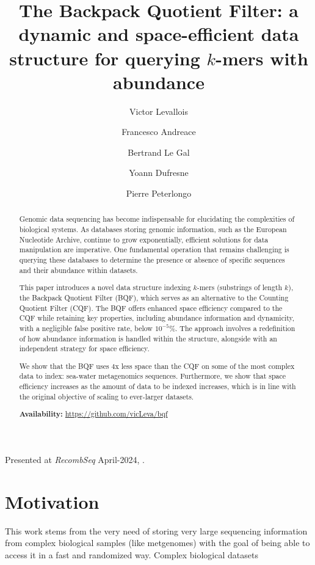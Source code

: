 \author
{
    Victor Levallois
    \and
    Francesco Andreace
    \and
    Bertrand Le Gal
    \and
    Yoann Dufresne
    \and
    Pierre Peterlongo
}
\title{The Backpack Quotient Filter: a dynamic and space-efficient data structure for querying $k$-mers with abundance}

\metadata
{   
    Presented at \emph{RecombSeq}
    April-2024,
    .
}
\maketitle
\label{pap:second}

\section{Motivation}
This work stems from the very need of storing very large sequencing information from complex biological samples (like metgenomes) with the goal of being able to access it in a fast and randomized way. Complex biological datasets
\begin{abstract}
Genomic data sequencing has become indispensable for elucidating the complexities of biological systems. As databases storing genomic information, such as the European Nucleotide Archive, continue to grow exponentially, efficient solutions for data manipulation are imperative. One fundamental operation that remains challenging is querying these databases to determine the presence or absence of specific sequences and their abundance within datasets.

This paper introduces a novel data structure indexing $k$-mers (substrings of length $k$), the Backpack Quotient Filter (BQF), which serves as an alternative to the Counting Quotient Filter (CQF). The BQF offers enhanced space efficiency compared to the CQF while retaining key properties, including abundance information and dynamicity, with a negligible false positive rate, below $10^{-5}\%$. The approach involves a redefinition of how abundance information is handled within the structure, alongside with an independent strategy for space efficiency. 

We show that the BQF uses 4x less space than the CQF on some of the most complex data to index: sea-water metagenomics sequences. Furthermore, we show that space efficiency increases as the amount of data to be indexed increases, which is in line with the original objective of scaling to ever-larger datasets.
    
    \textbf{Availability:} \url{https://github.com/vicLeva/bqf} 
\end{abstract}

